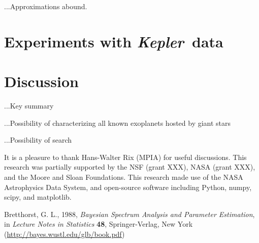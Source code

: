 \documentclass[12pt, preprint]{aastex}
\newcommand{\project}[1]{\textsl{#1}}
\newcommand{\Kepler}{\project{Kepler}}
\begin{document}
...Approximations abound.

\section{Experiments with \Kepler\ data}

\section{Discussion}

...Key summary

...Possibility of characterizing all known exoplanets hosted by giant stars

...Possibility of search

\acknowledgements
It is a pleasure to thank
  Hans-Walter Rix (MPIA)
for useful discussions.
This research was partially supported by the NSF (grant XXX), NASA
(grant XXX), and the Moore and Sloan Foundations.
This research made use of the NASA Astrophysics Data System, and
open-source software including Python, numpy, scipy, and matplotlib.

\begin{thebibliography}{}\raggedright
{}
  Bretthorst, G. L., 1988,
  \textit{Bayesian Spectrum Analysis and Parameter Estimation},
  in \textit{Lecture Notes in Statistics} \textbf{48},
  Springer-Verlag, New York
  \footnotesize{(\url{http://bayes.wustl.edu/glb/book.pdf})}
\end{thebibliography}
\end{document}

